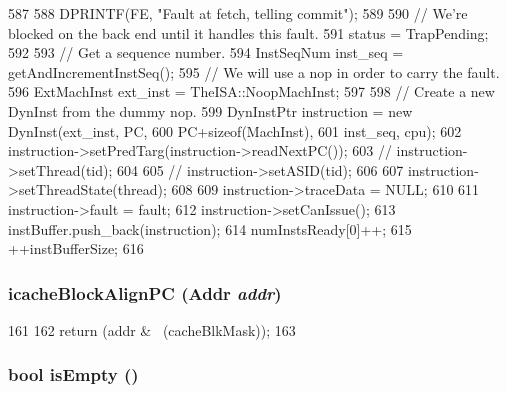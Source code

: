 \begin{DoxyCode}
587 {
588     DPRINTF(FE, "Fault at fetch, telling commit\n");
589 
590     // We're blocked on the back end until it handles this fault.
591     status = TrapPending;
592 
593     // Get a sequence number.
594     InstSeqNum inst_seq = getAndIncrementInstSeq();
595     // We will use a nop in order to carry the fault.
596     ExtMachInst ext_inst = TheISA::NoopMachInst;
597 
598     // Create a new DynInst from the dummy nop.
599     DynInstPtr instruction = new DynInst(ext_inst, PC,
600                                          PC+sizeof(MachInst),
601                                          inst_seq, cpu);
602     instruction->setPredTarg(instruction->readNextPC());
603 //    instruction->setThread(tid);
604 
605 //    instruction->setASID(tid);
606 
607     instruction->setThreadState(thread);
608 
609     instruction->traceData = NULL;
610 
611     instruction->fault = fault;
612     instruction->setCanIssue();
613     instBuffer.push_back(instruction);
614     numInstsReady[0]++;
615     ++instBufferSize;
616 }
\end{DoxyCode}
\hypertarget{classFrontEnd_a0a1c6bcaf75b2920f70132b2c9daba24}{
\subsubsection[{icacheBlockAlignPC}]{ icacheBlockAlignPC ({\bf Addr} {\em addr})}}
\label{classFrontEnd_a0a1c6bcaf75b2920f70132b2c9daba24}



\begin{DoxyCode}
161     {
162         return (addr & ~(cacheBlkMask));
163     }
\end{DoxyCode}
\hypertarget{classFrontEnd_af337ffd75e4f019ce15302c60715d84b}{
\subsubsection[{isEmpty}]{\setlength{\rightskip}{0pt plus 5cm}bool isEmpty ()}}
\label{classFrontEnd_af337ffd75e4f019ce15302c60715d84b}



